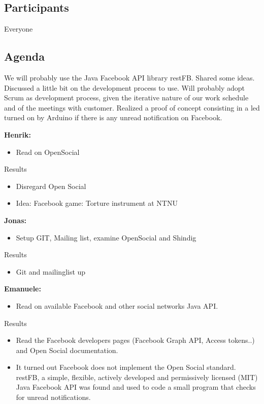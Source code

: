 \subsection{Participants}
Everyone

\subsection{Agenda}
We will probably use the Java Facebook API library restFB. 
Shared some ideas. Discussed a little bit on the development process to use.
Will probably adopt Scrum as development process, given the iterative nature of our work schedule and of the meetings with customer.
Realized a proof of concept consisting in a led turned on by Arduino if there is any unread notification on Facebook.

{\bf Henrik: } \newline
\begin{itemize}
\item Read on OpenSocial
\end{itemize}

Results
\begin{itemize}
\item Disregard Open Social
\item Idea: Facebook game: Torture instrument at NTNU
\end{itemize}

{\bf Jonas:} \newline
\begin{itemize}
\item Setup GIT, Mailing list, examine OpenSocial and Shindig
\end{itemize}

Results
\begin{itemize}
\item Git and mailinglist up
\end{itemize}

{\bf Emanuele: } \newline
\begin{itemize}
\item Read on available Facebook and other social networks Java API.
\end{itemize}

Results
\begin{itemize}
\item Read the Facebook developers pages (Facebook Graph API, Access tokens..)
and Open Social documentation. 
\item It turned out Facebook does not implement the Open Social standard. restFB, a simple, flexible, actively developed and permissively licensed (MIT) Java Facebook API was found and used to code a small program that checks for unread notifications.
\end{itemize}

